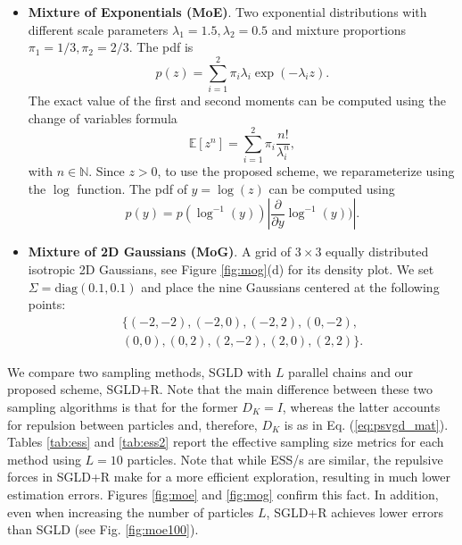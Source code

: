 \begin{itemize}
\setlength\itemsep{-0.2em}
\item \textbf{Mixture of Exponentials (MoE)}. Two exponential distributions with different scale parameters $\lambda_1 = 1.5, \lambda_2=0.5$ and mixture proportions $\pi_1 = 1/3, \pi_2 = 2/3$. The pdf is
$$ 
p(z) = \sum_{i=1}^2 \pi_{i}\lambda_i \exp(-\lambda_i z).
$$
The exact value of the first and second moments can be computed using the change of variables formula
\begin{equation*}
\mathbb{E} \left[z^n \right] = \sum_{i=1}^2 \pi_{i}\frac{n!}{\lambda_i^n},
\end{equation*}
with $n\in \mathbb{N}$. 
Since $z>0$, to use the proposed scheme, we reparameterize using the $\log$ function. The pdf of  $y = \log(z)$ can be computed using
\begin{equation*}
p(y) = p(\log^{-1}(y))\left|\dfrac{\partial}{\partial y} \log^{-1}(y))\right|.
\end{equation*}
\item \textbf{Mixture of 2D Gaussians (MoG)}. A grid of $3 \times 3$ equally distributed isotropic 2D Gaussians, see Figure \ref{fig:mog}(d) for its density plot.  We set $\Sigma = \mbox{diag} (0.1, 0.1)$ and place the nine Gaussians centered at the following points:
\begin{align*}
\lbrace (-2,-2), (-2, 0), (-2, 2), (0, -2), \\(0, 0), (0, 2), (2, -2), (2, 0), (2, 2)  \rbrace.
\end{align*}
\end{itemize}
We compare two sampling methods, SGLD with $L$ parallel chains and our proposed scheme, SGLD+R. Note that the main difference between these two sampling algorithms is that for the former ${D_K} = {I}$, whereas the latter accounts for repulsion between particles and, therefore, $D_K$ is as  in Eq. (\ref{eq:psvgd_mat}). Tables \ref{tab:ess} and \ref{tab:ess2} report the effective sampling size metrics \parencite{kass1998markov} for each method using $L=10$ particles. Note that while ESS/s are similar, the repulsive forces in SGLD+R make for a more efficient exploration, resulting in much lower estimation errors. Figures \ref{fig:moe} and \ref{fig:mog} confirm this fact. In addition, even when increasing the number of particles $L$, SGLD+R achieves lower errors than SGLD (see Fig. \ref{fig:moe100}).


